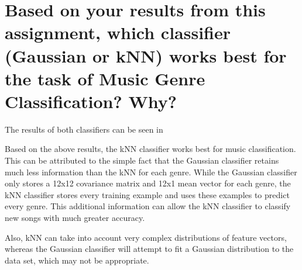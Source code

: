 \documentclass[a4paper,titlepage]{article}
\begin{document}
	\section{Based on your results from this assignment, which classifier (Gaussian or kNN) works best for the task of Music Genre Classification? Why?}
	
	The results of both classifiers can be seen in %
	
	Based on the above results, the kNN classifier works best for music classification. This can be attributed to the simple fact that the Gaussian classifier retains much less information than the kNN for each genre. While the Gaussian classifier only stores a 12x12 covariance matrix and 12x1 mean vector for each genre, the kNN classifier stores every training example and uses these examples to predict every genre. This additional information can allow the kNN classifier to classify new songs with much greater accuracy. 
	
	Also, kNN can take into account very complex distributions of feature vectors, whereas the Gaussian classifier will attempt to fit a Gaussian distribution to the data set, which may not be appropriate.
	
	
	
\end{document}
